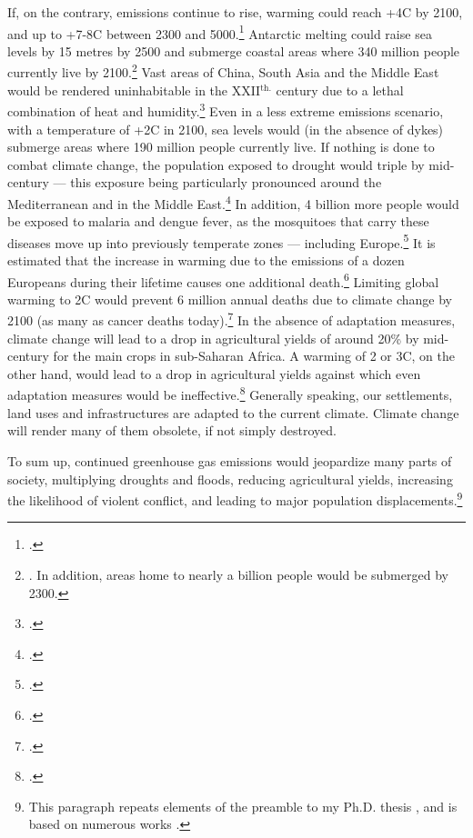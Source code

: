 \documentclass[a5paper,english,openany]{memoir}
\begin{document}
If, on the contrary, emissions continue to rise, warming could reach +4\textdegree{}C by 2100, and up to +7-8\textdegree{}C between 2300 and 5000.\footnote{\citet{montenegro_long_2007}.} Antarctic melting could raise sea levels by 15 metres by 2500 and submerge coastal areas where 340 million people currently live by 2100.\footnote{\citet{deconto_contribution_2016,kopp_evolving_2017,kulp_new_2019}. In addition, areas home to nearly a billion people would be submerged by 2300.} Vast areas of China, South Asia and the Middle East would be rendered uninhabitable in the XXII$^\text{th.}$ century due to a lethal combination of heat and humidity.\footnote{\citet{pal_future_2016,im_deadly_2017,kang_north_2018}.} Even in a less extreme emissions scenario, with a temperature of +2\textdegree{}C in 2100, sea levels would (in the absence of dykes) submerge areas where 190 million people currently live. %
If nothing is done to combat climate change, the population exposed to drought would triple by mid-century --- this exposure being particularly pronounced around the Mediterranean and in the Middle East.\footnote{\citet{elliott_constraints_2014,marzi_assessing_2021}.} In addition, 4 billion more people would be exposed to malaria and dengue fever, as the mosquitoes that carry these diseases move up into previously temperate zones --- including Europe.\footnote{\cite{colon-gonzalez_projecting_2021}.} It is estimated that the increase in warming due to the emissions of a dozen Europeans during their lifetime causes one additional death.\footnote{\citet{bressler_mortality_2021}.} Limiting global warming to 2\textdegree{}C would prevent 6 million annual deaths due to climate change by 2100 (as many as cancer deaths today).\footnote{\citet{carleton_valuing_2022}.} In the absence of adaptation measures, climate change will lead to a drop in agricultural yields of around 20\% by mid-century for the main crops in sub-Saharan Africa. A warming of 2 or 3\textdegree{}C, on the other hand, would lead to a drop in agricultural yields against which even adaptation measures would be ineffective.\footnote{\citet{moore_new_2017,schlenker_robust_2010}.} Generally speaking, our settlements, land uses and infrastructures are adapted to the current climate. Climate change will render many of them obsolete, if not simply destroyed. 

To sum up, continued greenhouse gas emissions would jeopardize many parts of society, multiplying droughts and floods, reducing agricultural yields, increasing the likelihood of violent conflict, and leading to major population displacements.\footnote{This paragraph repeats elements of the preamble to my Ph.D. thesis \citep{fabre_is_2020}, and is based on numerous works \citep{cattaneo_human_2019,carleton_social_2016,dell_temperature_2012}.} 
\end{document}
